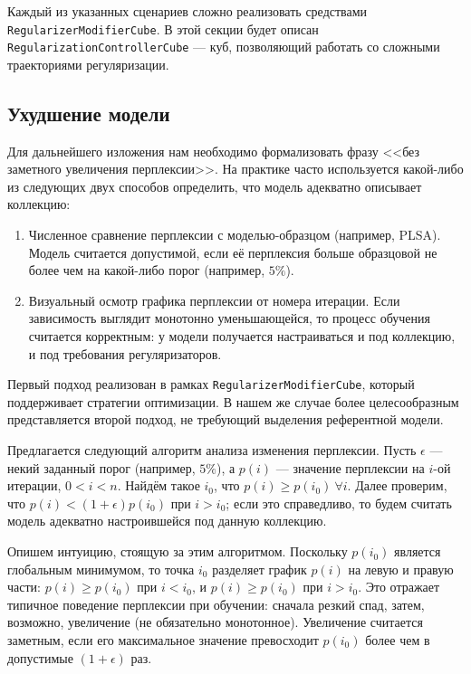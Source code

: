 Каждый из указанных сценариев сложно реализовать средствами \texttt{RegularizerModifierCube}. В этой секции будет описан \texttt{RegularizationControllerCube} --- куб, позволяющий работать со сложными траекториями регуляризации.  

\subsection{Ухудшение модели} 

Для дальнейшего изложения нам необходимо формализовать фразу <<без заметного увеличения перплексии>>. На практике часто используется какой-либо из следующих двух способов определить, что модель адекватно описывает коллекцию: 

\begin{enumerate}

    \item Численное сравнение перплексии с моделью-образцом (например, PLSA). Модель считается допустимой, если её перплексия больше образцовой не более чем на какой-либо порог (например, $5\%$).

    \item Визуальный осмотр графика перплексии от номера итерации. Если зависимость выглядит монотонно уменьшающейся, то процесс обучения считается корректным: у модели получается настраиваться и под коллекцию, и под требования регуляризаторов.

\end{enumerate} 

Первый подход реализован в рамках \texttt{RegularizerModifierCube}, который поддерживает стратегии оптимизации. В нашем же случае более целесообразным представляется второй подход, не требующий выделения референтной модели.  

Предлагается следующий алгоритм анализа изменения перплексии. Пусть $\epsilon$ --- некий заданный порог (например, $5\%$), а  $p(i)$ --- значение перплексии на $i$-ой итерации, $0 < i < n$. Найдём такое $i_0$, что $p(i) \geq p(i_0)~\forall i$. Далее проверим, что $p(i) < (1 + \epsilon) p(i_0)$ при $i > i_0$; если это справедливо, то будем считать модель адекватно настроившейся под данную коллекцию.  

Опишем интуицию, стоящую за этим алгоритмом. Поскольку $p(i_0)$ является глобальным минимумом, то точка $i_0$ разделяет график $p(i)$ на левую и правую части: $p(i) \geq p(i_0)$ при $i < i_0$, и $p(i) \geq p(i_0)$ при $i > i_0$. Это отражает типичное поведение перплексии при обучении: сначала резкий спад, затем, возможно, увеличение (не обязательно монотонное). Увеличение считается заметным, если его максимальное значение превосходит $p(i_0)$ более чем в допустимые $(1 + \epsilon)$ раз.  

